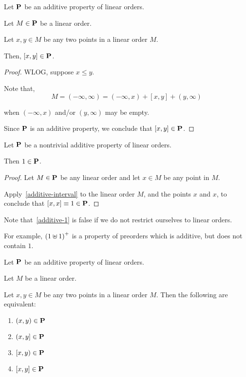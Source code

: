 \begin{lemma}\label{additive-interval}
  Let $\mathbf{P}$ be an additive property of linear orders.

  Let $M \in \mathbf{P}$ be a linear order.

  Let $x, y \in M$ be any two points in a linear order $M$.

  Then, $[x, y] \in \mathbf{P}$.
\end{lemma}

\begin{proof}
  WLOG, suppose $x \le y$.

  Note that,
  \[
    M = (-\infty, \infty) = (-\infty, x) + [x, y] + (y, \infty)
  \]

  when $(-\infty, x)$ and/or $(y, \infty)$ may be empty.

  Since $\mathbf{P}$ is an additive property, we conclude that $[x, y] \in \mathbf{P}$.
\end{proof}

\begin{corollary}\label{additive-1}
  Let $\mathbf{P}$ be a nontrivial additive property of linear orders.

  Then $1 \in \mathbf{P}$.
\end{corollary}

\begin{proof}
  Let $M \in \mathbf{P}$ be any linear order and let
  $x \in M$ be any point in $M$.

  Apply~\cref{additive-interval} to the linear order $M$,
  and the points $x$ and $x$, to conclude that
  $[x, x] \equiv 1 \in \mathbf{P}$.
\end{proof}

\begin{note}
  Note that~\cref{additive-1} is false if we do not restrict ourselves to linear orders.

  For example, $\left( {1 \uplus 1} \right)^+$ is a property of preorders
  which is additive, but does not contain $1$.
\end{note}

\begin{corollary}\label{additive-endpoints}
  Let $\mathbf{P}$ be an additive property of linear orders.

  Let $M$ be a linear order.

  Let $x, y \in M$ be any two points in a linear order $M$.
  Then the following are equivalent:

  \begin{enumerate}
    \item $(x, y) \in \mathbf{P}$
    \item $(x, y] \in \mathbf{P}$
    \item $[x, y) \in \mathbf{P}$
    \item $[x, y] \in \mathbf{P}$
  \end{enumerate}
\end{corollary}


